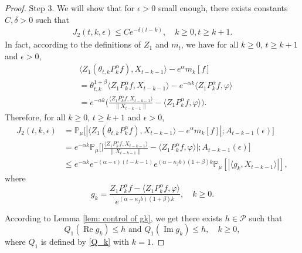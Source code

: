 \documentclass[12pt,a4paper]{amsart}
\theoremstyle{plain}
\theoremstyle{definition}
\numberwithin{equation}{section}
\begin{document}
\begin{proof}
    Step 3.
    We will show that for $\epsilon>0$ small enough, there exists constants $C, \delta>0$ such that
    \begin{equation}\begin{split}
    \label{eq:31step3}
      J_2(t,k,\epsilon)
      \leq Ce^{-\delta (t-k)},
      \quad k\geq 0, t\geq k+1.
    \end{split}\end{equation}
    In fact, according to the definitions of $Z_1$ and $m_t$, we have for all $k\geq 0$, $t\geq k+1$ and $\epsilon> 0$,
    \begin{equation}\begin{split}
          &\langle Z_1(\theta_{t,k}P^\alpha_k f),X_{t-k-1}\rangle-e^{\alpha}m_k[f]
          \\&= \theta_{t,k}^{1+\beta} \langle Z_1P^\alpha_k f,X_{t-k-1}\rangle - e^{-\alpha k}\langle  Z_1P^\alpha_k f,\varphi\rangle
          \\&=e^{-\alpha k}\Big(\frac{\langle Z_1P^\alpha_k f ,X_{t-k-1}\rangle}{\|X_{t-k-1}\|}-\langle  Z_1P^\alpha_k f ,\varphi\rangle\Big).
    \end{split}\end{equation}
Therefore, for all $k\geq 0$, $t\geq k+1$ and $\epsilon> 0$,
\begin{equation}\begin{split}
\label{eq: prevJ2}
J_2(t,k,\epsilon)&
    = \mathbb P_\mu\big[|\langle Z_1(\theta_{t,k}P^\alpha_k f),X_{t-k-1}\rangle-e^{\alpha}m_k[f]|;A_{t-k-1}(\epsilon)\big]
    \\&=e^{-\alpha k}\mathbb{P}_{\mu}\bigg[\Big|\frac{\langle Z_1P^{\alpha}_k f,X_{t-k-1}\rangle}{\|X_{t-k-1}\|}-\langle  Z_1P^{\alpha}_k f,\varphi\rangle\Big|;A_{t-k-1}(\epsilon)\bigg]\nonumber\\
    &\leq e^{-\alpha k}e^{-(\alpha-\epsilon)(t-k-1)}e^{(\alpha-\kappa_f b)(1+\beta)k} \mathbb{P}_{\mu}\left[\left|\langle g_k,X_{t-k-1}\rangle\right|\right],
\end{split}\end{equation}
where
\[
g_k
    = \frac{Z_1 P^{\alpha}_k f-\langle  Z_1P^{\alpha}_k f,\varphi\rangle}{e^{(\alpha-\kappa_f b)(1+\beta)k}},
    \quad k \geq 0.
\]

According to Lemma \ref{lem: control of gk}, we get there exists $h\in \mathcal{P}$ such that
 \[
    Q_1 (\operatorname{Re} g_k) \leq h
    \text{ and } Q_1 (\operatorname{Im} g_k)\leq h,
    \quad k \geq 0,
 \]
    where $Q_1$ is defined by \eqref{Q_k} with $k=1$.


\end{proof}
\end{document}
